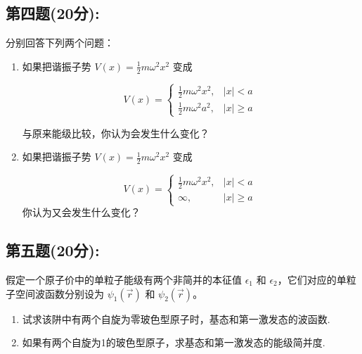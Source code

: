 \subsection{第四题(20分):}
分别回答下列两个问题：

\begin{enumerate}
    \item  如果把谐振子势 $V(x) = \frac{1}{2} m \omega^2 x^2$ 变成

    \[
    V(x) =
    \begin{cases}
    \frac{1}{2} m \omega^2 x^2, & |x| < a \\
    \frac{1}{2} m \omega^2 a^2, & |x| \geq a
    \end{cases}~
    \]

    与原来能级比较，你认为会发生什么变化？

    \item  如果把谐振子势 $V(x) = \frac{1}{2} m \omega^2 x^2$ 变成

    \[
    V(x) =
    \begin{cases}
    \frac{1}{2} m \omega^2 x^2, & |x| < a \\
    \infty, & |x| \geq a
    \end{cases}~
    \]
    你认为又会发生什么变化？
\end{enumerate}
\subsection{第五题(20分):}
假定一个原子价中的单粒子能级有两个非简并的本征值 $\epsilon_1$ 和 $\epsilon_2$，它们对应的单粒子空间波函数分别设为 $\psi_1(\vec r)$ 和 $\psi_2(\vec r)$。

\begin{enumerate}
    \item  试求该阱中有两个自旋为零玻色型原子时，基态和第一激发态的波函数.
    \item  如果有两个自旋为1的玻色型原子，求基态和第一激发态的能级简并度.
\end{enumerate}